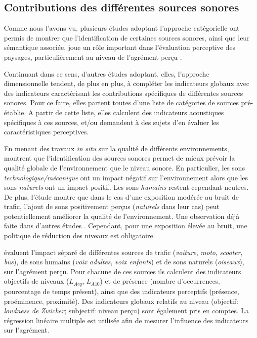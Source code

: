 \subsection{Contributions des différentes sources sonores}
\label{sec:ch3_contribSource}

Comme nous l'avons vu, plusieurs études adoptant l'approche catégorielle ont permis de montrer que l'identification de certaines sources sonores, ainsi que leur sémantique associée, joue un rôle important dans l'évaluation perceptive des paysages, particulièrement au niveau de l'agrément perçu \citep{defreville2004aactivity,guastavino2006ideal,nilsson2007soundscape,szeremeta2009analysis,gozalo2015relationship}.

Continuant dans ce sens, d'autres études adoptant, elles, l'approche dimensionnelle tendent, de plus en plus, à compléter les indicateurs globaux avec des indicateurs caractérisant les contributions spécifiques de différentes sources sonores. Pour ce faire, elles partent toutes d'une liste de catégories de sources pré-établie. A partir de cette liste, elles calculent des indicateurs acoustiques spécifiques à ces sources, et/ou demandent à des sujets d'en évaluer les caractéristiques perceptives.

En menant des travaux \emph{in situ} sur la qualité de différents environnements, \citep{nilsson2007acoustic,nilsson2007soundscape} montrent que l'identification des sources sonores permet de mieux prévoir la qualité globale de l'environnement que le niveau sonore. En particulier, les sons \emph{technologique/mécanique} ont un impact négatif sur l'environnement alors que les sons \emph{naturels} ont un impact positif. Les sons \emph{humains} restent cependant neutres. De plus, l'étude montre que dans le cas d'une exposition modérée au bruit de trafic, l'ajout de sons positivement perçus (\emph{naturels} dans leur cas) peut potentiellement améliorer la qualité de l'environnement. Une observation déjà faite dans d'autres études \citep{hong2013designing,galbrun2012perceptual}. Cependant, pour une exposition élevée au bruit, une politique de réduction des niveaux est obligatoire.

\citep{defreville2004aactivity,lavandier2006contribution} évaluent l'impact séparé de différentes sources de trafic (\emph{voiture}, \emph{moto}, \emph{scooter}, \emph{bus}), de sons humains (\emph{voix adultes}, \emph{voix enfants}) et de sons naturels (\emph{oiseaux}), sur l'agrément perçu. Pour chacune de ces sources ils calculent des indicateurs objectifs de niveaux ($L_{Aeq}$, $L_{A10}$) et de présence (nombre d’occurrences, pourcentage de temps présent), ainsi que des indicateurs perceptifs (présence, proéminence, proximité). Des indicateurs globaux relatifs au niveau (objectif: \emph{loudness de Zwicker}; subjectif: niveau perçu) sont également pris en comptes. La régression linéaire multiple est utilisée afin de mesurer l'influence des indicateurs sur l'agrément.

